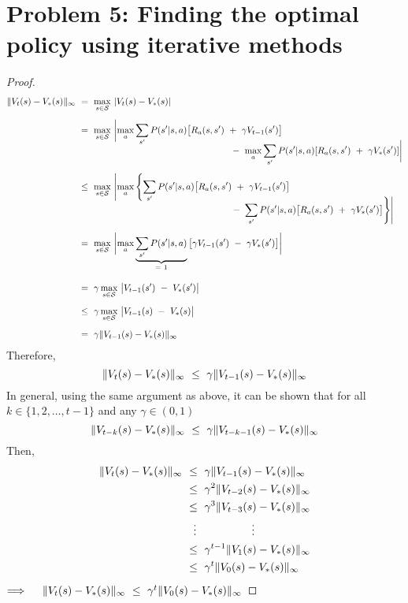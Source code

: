 \documentclass[twoside,11pt]{homework}
\DeclarePairedDelimiter{\2norm}{\lVert}{\rVert^2_2}
\newcommand{\1}[1]{\mathds{1}\left[#1\right]}
\DeclarePairedDelimiter{\infnorm}{\lVert}{\rVert_{\infty}}
\DeclarePairedDelimiter\abs{\lvert}{\rvert}
\begin{document}
\section*{\large Problem 5: Finding the optimal policy using iterative methods}
\begin{proof}
\begin{align*}
\infnorm{V_t(s) - V_*(s)} \ & = \ \max_{s \in \mathcal{S}} \ \lvert V_t(s) - V_*(s) \rvert \\[0.5em]
& = \ \max_{s \in \mathcal{S}} \ \abs[\bigg]{\max_{a} \sum_{s'} P(s' | s, a)\big[R_a(s, s') \ + \  \gamma V_{t-1}(s')\big] \\[-0.9em]
&\quad \ \ \ \ \ \ \ \ \ \ \ \ \ \ \ \ \ \ \ \ \ \ \ \ \ \ \ \ \ \ \ \ \ \ \ \ \ \ \ \ \ \ \ \ \ \ \ - \ \max_{a} \sum_{s'} P(s' | s, a)[R_a(s, s') \ + \ \gamma V_*(s')]} \\[0.5em]
& \leq \ \max_{s \in \mathcal{S}} \ \abs[\Bigg]{\max_{a} \left\lbrace \sum_{s'} P(s' | s, a)\big[R_a(s, s') \ + \ \gamma V_{t-1}(s')\big] \right. \\[-0.9em]
&\quad \ \ \ \ \ \ \ \ \ \ \ \ \ \ \ \ \ \ \ \ \ \ \ \ \ \ \ \ \ \ \ \ \ \ \ \ \ \ \ \ \ \ \ \ \ \ \ \left. - \ \sum_{s'} P(s' | s, a)\big[R_a(s, s') \ + \ \gamma V_*(s')\big]\right\rbrace} \\[0.5em]
& = \ \max_{s \in \mathcal{S}} \ \abs[\bigg]{\max_{a} \underbrace{\sum_{s'} P(s' | s, a)}_{= \ 1}\big[\gamma V_{t-1}(s')  \ - \ \gamma V_*(s')\big]} \\[1em]
& = \ \gamma\max_{s \in \mathcal{S}} \ \abs[\big]{V_{t-1}(s') \ - \ V_*(s')} \\[0.5em]
& \leq \ \gamma\max_{s \in \mathcal{S}} \ \abs[\big]{V_{t-1}(s)  \ - \ V_*(s)} \\[0.5em]
& = \ \gamma\infnorm{V_{t-1}(s) - V_*(s)}
\end{align*}
Therefore,  $$\infnorm{V_t(s) - V_*(s)} \ \leq \ \gamma\infnorm{V_{t-1}(s) - V_*(s)}$$
In general, using the same argument as above, it can be shown that for all $k \in \{1, 2, \dots, t-1\}$ and any $\gamma \in (0, 1)$
$$\infnorm{V_{t-k}(s) - V_*(s)} \ \leq \ \gamma\infnorm{V_{t-k-1}(s) - V_*(s)}$$
Then,
\begin{align*}
\infnorm{V_t(s) - V_*(s)} \ & \leq \ \gamma\infnorm{V_{t-1}(s) - V_*(s)}\\
& \leq \ \gamma^2\infnorm{V_{t-2}(s) - V_*(s)}\\
& \leq \ \gamma^3\infnorm{V_{t-3}(s) - V_*(s)}\\
& \ \ \vdots \ \ \ \ \ \ \ \ \ \ \ \ \ \ \ \vdots \\
& \leq \ \gamma^{t-1}\infnorm{V_{1}(s) - V_*(s)}\\
& \leq \ \gamma^t\infnorm{V_0(s) - V_*(s)}\\
\end{align*}
$\Longrightarrow \ \ \ \ \infnorm{V_t(s) - V_*(s)} \ \leq \ \gamma^t\infnorm{V_0(s) - V_*(s)}$
\end{proof}
\end{document}
